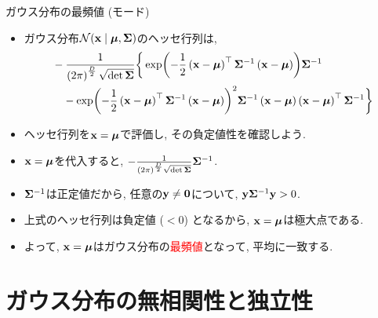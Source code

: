 \documentclass[dvipdfmx,notheorems,t]{beamer}
\begin{document}
\begin{frame}{ガウス分布の最頻値 (モード)}
\begin{itemize}
  \item ガウス分布$\mathcal{N}(\vb{x} \mid \vb*{\mu}, \vb{\Sigma})$のヘッセ行列は,
  {\small \begin{align*}
    & -\frac{1}{\left( 2\pi \right)^\frac{D}{2} \sqrt{\det \vb{\Sigma}}}
      \bigg\{ \exp(-\frac{1}{2} \left( \vb{x} - \vb*{\mu} \right)^\top \vb{\Sigma}^{-1}
      \left( \vb{x} - \vb*{\mu} \right)) \vb{\Sigma}^{-1} \\
    & \quad - \exp(-\frac{1}{2} \left( \vb{x} - \vb*{\mu} \right)^\top \vb{\Sigma}^{-1}
      \left( \vb{x} - \vb*{\mu} \right))^2
      \vb{\Sigma}^{-1} \left( \vb{x} - \vb*{\mu} \right)
      \left( \vb{x} - \vb*{\mu} \right)^\top \vb{\Sigma}^{-1} \bigg\}
  \end{align*}}
  \item ヘッセ行列を$\vb{x} = \vb*{\mu}$で評価し, その負定値性を確認しよう.
  \item $\vb{x} = \vb*{\mu}$を代入すると,
  $-\frac{1}{\left( 2\pi \right)^\frac{D}{2} \sqrt{\det \vb{\Sigma}}} \vb{\Sigma}^{-1}$.
  \item $\vb{\Sigma}^{-1}$は正定値だから, 任意の$\vb{y} \neq \vb{0}$について, $\vb{y} \vb{\Sigma}^{-1} \vb{y} > 0$.
  \item 上式のヘッセ行列は負定値 ($< 0$) となるから, $\vb{x} = \vb*{\mu}$は極大点である.
  \item よって, $\vb{x} = \vb*{\mu}$はガウス分布の\textcolor{red}{最頻値}となって, 平均に一致する.
\end{itemize}
\end{frame}

\section{ガウス分布の無相関性と独立性}
\end{document}
